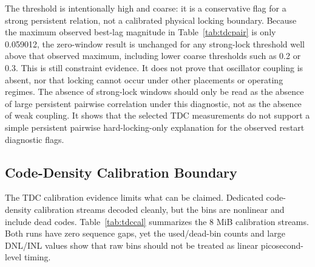 \documentclass[journal]{IEEEtran}
\newcommand{\tdc}{TDC}
\begin{document}
The threshold is intentionally high and coarse: it is a conservative flag for a strong persistent relation, not a calibrated physical locking boundary. Because the maximum observed best-lag magnitude in Table~\ref{tab:tdcpair} is only 0.059012, the zero-window result is unchanged for any strong-lock threshold well above that observed maximum, including lower coarse thresholds such as 0.2 or 0.3. This is still constraint evidence. It does not prove that oscillator coupling is absent, nor that locking cannot occur under other placements or operating regimes. The absence of strong-lock windows should only be read as the absence of large persistent pairwise correlation under this diagnostic, not as the absence of weak coupling. It shows that the selected \tdc{} measurements do not support a simple persistent pairwise hard-locking-only explanation for the observed restart diagnostic flags.

\subsection{Code-Density Calibration Boundary}

The \tdc{} calibration evidence limits what can be claimed. Dedicated code-density calibration streams decoded cleanly, but the bins are nonlinear and include dead codes. Table~\ref{tab:tdccal} summarizes the 8 MiB calibration streams. Both runs have zero sequence gaps, yet the used/dead-bin counts and large DNL/INL values show that raw bins should not be treated as linear picosecond-level timing.

\begin{table}[!t]
\centering
\caption{8 MiB \tdc{} code-density calibration boundary.}
\label{tab:tdccal}
\scriptsize
{}
\end{table}
\end{document}
